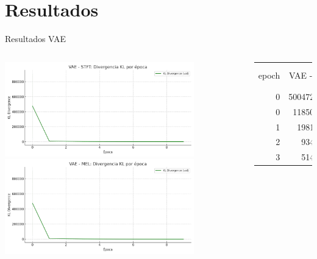 \documentclass{beamer}
\newcommand{\currentsectionindex}{0}
\begin{document}
\renewcommand{\currentsectionindex}{5}
\section{Resultados}
\begin{frame}{Resultados VAE}
  
  \begin{columns}
    \vspace{1cm}
    \column{7.5cm}
    
    \begin{center}
      \includegraphics[width=0.8\textwidth]{images/vae_stft_kl_plot.png }
      \includegraphics[width=0.8\textwidth]{images/vae_mel_kl_plot.png }
    \end{center}
    \column{4cm}
    \begin{table}
      \centering
      {\fontsize{6pt}{8pt}\selectfont
        \begin{tabular}{rrr}
        epoch & VAE - STFT & VAE - MEL \\
            0 & 5004723.0000 & 911838.0312 \\
            0 &  118500.9789 &  43615.9243 \\
            1 &   19814.0174 &   8572.7893 \\
            2 &    9341.8965 &   4389.1960 \\
            3 &    5147.5633 &   2377.8468 \\

\end{tabular}}
\end{table}
\end{columns}
\end{frame}
\end{document}
